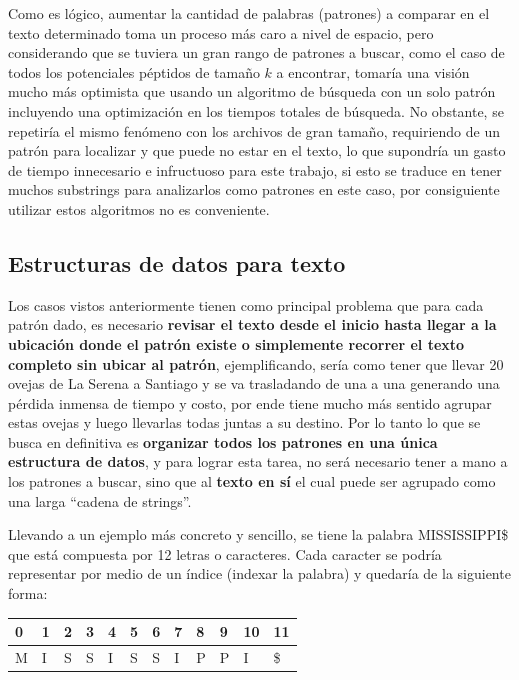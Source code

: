 Como es lógico, aumentar la cantidad de palabras (patrones) a comparar en el texto determinado toma un proceso más caro a nivel de espacio, pero considerando que se tuviera un gran rango de patrones a buscar, como el caso de todos los potenciales péptidos de tamaño $k$ a encontrar, tomaría una visión mucho más optimista que usando un algoritmo de búsqueda con un solo patrón incluyendo una optimización en los tiempos totales de búsqueda. No obstante, se repetiría el mismo fenómeno con los archivos de gran tamaño, requiriendo de un patrón para localizar y que puede no estar en el texto, lo que supondría un gasto de tiempo innecesario e infructuoso para este trabajo, si esto se traduce en tener muchos substrings para analizarlos como patrones en este caso, por consiguiente utilizar estos algoritmos no es conveniente.



\subsection{Estructuras de datos para texto}

Los casos vistos anteriormente tienen como principal problema que para cada patrón dado, es necesario \textbf{revisar el texto desde el inicio hasta llegar a la ubicación donde el patrón existe o simplemente recorrer el texto completo sin ubicar al patrón}, ejemplificando, sería como tener que llevar 20 ovejas de La Serena a Santiago y se va trasladando de una a una generando una pérdida inmensa de tiempo y costo, por ende tiene mucho más sentido agrupar estas ovejas y luego llevarlas todas juntas a su destino. Por lo tanto lo que se busca en definitiva es \textbf{organizar todos los patrones en una única estructura de datos}, y para lograr esta tarea, no será necesario tener a mano a los patrones a buscar, sino que al \textbf{texto en sí} el cual puede ser agrupado como una larga ``cadena de strings''.

Llevando a un ejemplo más concreto y sencillo, se tiene la palabra MISSISSIPPI\$ que está compuesta por 12 letras o caracteres. Cada caracter se podría representar por medio de un índice (indexar la palabra) y quedaría de la siguiente forma:

\begin{table}[h]
\centering
\begin{tabular}{llllllllllll}
0                       & 1                      & 2                      & 3                      & 4                      & 5                      & 6                      & 7                      & 8                      & 9                      & 10                     & 11                     \\ \hline
\multicolumn{1}{|l|}{M} & \multicolumn{1}{l|}{I} & \multicolumn{1}{l|}{S} & \multicolumn{1}{l|}{S} & \multicolumn{1}{l|}{I} & \multicolumn{1}{l|}{S} & \multicolumn{1}{l|}{S} & \multicolumn{1}{l|}{I} & \multicolumn{1}{l|}{P} & \multicolumn{1}{l|}{P} & \multicolumn{1}{l|}{I} & \multicolumn{1}{l|}{\$} \\ \hline
\end{tabular}
\end{table}


